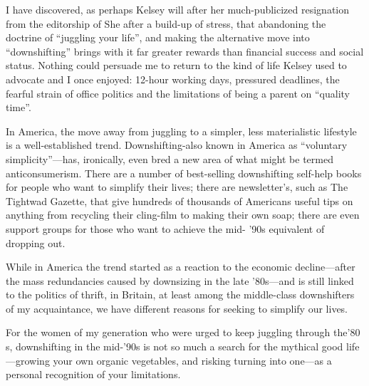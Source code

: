 I have discovered, as perhaps Kelsey will after her much-publicized
resignation from the editorship of She after a build-up of stress, that
abandoning the doctrine of ``juggling your life'', and making the
alternative move into ``downshifting'' brings with it far greater
rewards than financial success and social status. Nothing could persuade
me to return to the kind of life Kelsey used to advocate and I once
enjoyed: 12-hour working days, pressured deadlines, the fearful strain
of office politics and the limitations of being a parent on ``quality
time''.

In America, the move away from juggling to a simpler, less materialistic
lifestyle is a well-established trend. Downshifting-also known in
America as ``voluntary simplicity''---has, ironically, even bred a new
area of what might be termed anticonsumerism. There are a number of
best-selling downshifting self-help books for people who want to simplify
their lives; there are newsletter's, such as The Tightwad Gazette, that
give hundreds of thousands of Americans useful tips on anything from
recycling their cling-film to making their own soap; there are even
support groups for those who want to achieve the mid- '90s equivalent of
dropping out.

While in America the trend started as a reaction to the economic
decline---after the mass redundancies caused by downsizing in the
late '80s---and is still linked to the politics of thrift, in Britain,
at least among the middle-class downshifters of my acquaintance, we have
different reasons for seeking to simplify our lives.

For the women of my generation who were urged to keep juggling through
the'80 s, downshifting in the mid-'90s is not so much a search for the
mythical good life---growing your own organic vegetables, and risking
turning into one---as a personal recognition of your limitations.


